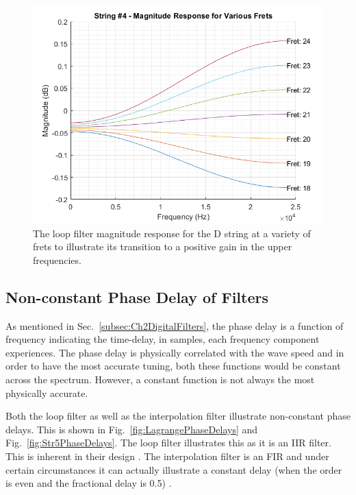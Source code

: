 \documentclass[../main.tex]{subfiles}
\begin{document}
\begin{figure}[h]
    \centering
    \includegraphics[scale=.65]{./images/plots/Unstable Loop Filter - String 4.png}
    \caption{The loop filter magnitude response for the D string at a variety of frets to illustrate its transition to a positive gain in the upper frequencies.}
    \label{fig:UnstableLoopString4}
\end{figure}

\clearpage

\subsection{Non-constant Phase Delay of Filters}
As mentioned in Sec.~\ref{subsec:Ch2DigitalFilters}, the phase delay is a function of frequency indicating the time-delay, in samples, each frequency component experiences. The phase delay is physically correlated with the wave speed and in order to have the most accurate tuning, both these functions would be constant across the spectrum. However, a constant function is not always the most physically accurate.

Both the loop filter as well as the interpolation filter illustrate non-constant phase delays. This is shown in Fig.~\ref{fig:LagrangePhaseDelays} and Fig.~\ref{fig:Str5PhaseDelays}. The loop filter illustrates this as it is an IIR filter. This is inherent in their design . The interpolation filter is an FIR and under certain circumstances it can actually illustrate a constant delay (when the order is even and the fractional delay is 0.5) .
\end{document}
